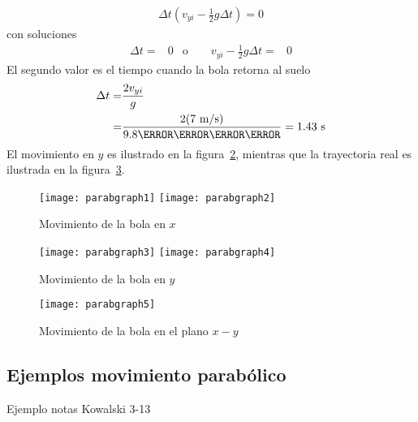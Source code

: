 \begin{itemize}
\begin{itemize}
\begin{align*}
 \Delta t(v_{yi}-\frac{1}{2}g\Delta t)=0   
  \end{align*}
con soluciones
  \begin{align}
    \Delta t=&0 &\text{o}\qquad v_{yi}-\frac{1}{2}g\Delta t=&0
  \end{align}
El segundo valor es el tiempo cuando la bola retorna al suelo
\begin{align}
  \Delta t=&\frac{2 v_{yi}}{g}\nonumber\\
=&\frac{2(7\ \text{m/s})}{9.8\newton\per\kilo\gram} =1.43\ \text{s}
\end{align}
El movimiento en $y$ es ilustrado en la figura~\ref{fig:parabgraph3}, mientras que la trayectoria real es ilustrada en la figura~\ref{fig:parabgraph5}.
\end{itemize}

\end{itemize}



\begin{frame}
\begin{figure}
  \centering
  \texttt{[image: parabgraph1]} \texttt{[image: parabgraph2]}
  \caption{Movimiento de la bola en $x$}
  \label{fig:parabgraph1}
\end{figure}
\end{frame}

\begin{frame}
\begin{figure}
  \centering
  \texttt{[image: parabgraph3]}  \texttt{[image: parabgraph4]}
  \caption{Movimiento de la bola en $y$}
  \label{fig:parabgraph3}
\end{figure}
\end{frame}

\begin{frame}
\begin{figure}
  \centering
  \texttt{[image: parabgraph5]}
  \caption{Movimiento de la bola en el plano $x-y$}
  \label{fig:parabgraph5}
\end{figure}
\end{frame}

\subsection{Ejemplos movimiento parabólico}

\begin{inprogress}
  Ejemplo notas Kowalski 3-13
\end{inprogress}

